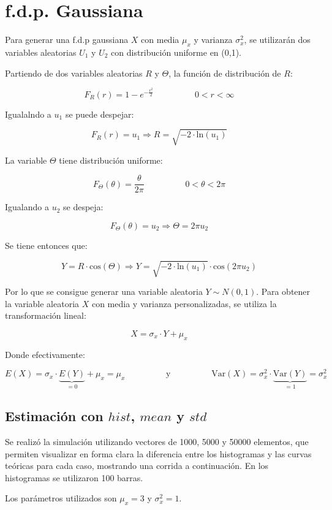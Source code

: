 



\tableofcontents
\newpage

\section{f.d.p. Gaussiana}

Para generar una f.d.p gaussiana $X$ con media $\mu_x$ y varianza $\sigma^2_x$, se utilizarán dos variables aleatorias $U_1$ y $U_2$ con distribución uniforme en (0,1).\par
Partiendo de dos variables aleatorias $R$ y $\Theta$, la función de distribución de $R$:

\[
F_R(r) = 1 - e^{-\frac{r^2}{2}} \hspace{2cm} 0<r<\infty
\]

Igualalndo a $u_1$ se puede despejar:

\[
F_R(r) = u_1 \Longrightarrow R = \sqrt{-2 \cdot \textrm{ln}(u_1)}
\]

La variable $\Theta$ tiene distribución uniforme:

\[
F_{\Theta}(\theta) = \frac{\theta}{2\pi} \hspace{2cm} 0<\theta<2\pi
\] 

Igualando a $u_2$ se despeja:

\[
F_{\Theta}(\theta) = u_2 \Longrightarrow \Theta = 2 \pi u_2
\]

Se tiene entonces que:

\[
Y = R \cdot \textrm{cos}(\Theta) \Longrightarrow Y = \sqrt{-2 \cdot \textrm{ln}(u_1)} \cdot \textrm{cos}(2 \pi u_2)
\]

Por lo que se consigue generar una variable aleatoria $Y\sim N(0,1)$. Para obtener la variable aleatoria $X$ con media y varianza personalizadas, se utiliza la transformación lineal:

\[
X = \sigma_x \cdot Y + \mu_x
\]
\par
Donde efectivamente:

\[
E(X) = \sigma_x \cdot \underbrace{E(Y)}_{=0} + \mu_x = \mu_x \hspace{2cm} \textrm{y} \hspace{2cm} \textrm{Var}(X) = \sigma^2_x \cdot \underbrace{\textrm{Var}(Y)}_{=1} = \sigma^2_x 
\]

\subsection{Estimación con $hist$, $mean$ y $std$}
Se realiz\'o la simulación utilizando vectores de 1000, 5000 y 50000 elementos, que permiten visualizar en forma clara la diferencia entre los histogramas y las curvas te\'oricas para cada caso, mostrando una corrida a continuación. En los histogramas se utilizaron 100 barras.\par
Los par\'ametros utilizados son $\mu_x = 3$ y $\sigma^2_x = 1$.

